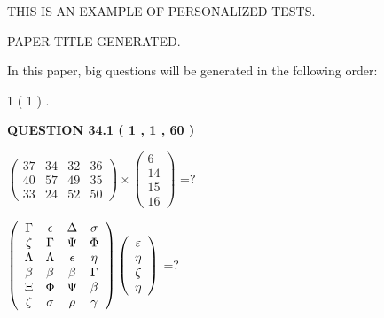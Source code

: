 \documentclass[12pt]{article}
\begin{document}
   
   
   
   
   
 \vspace{0.2in}
{\Huge  THIS IS AN EXAMPLE OF}
{\Huge  PERSONALIZED TESTS. }
   
   
 PAPER TITLE GENERATED.
   
   
   
\vspace{0.2in}
   
In this paper, big questions will be generated in the following order: 
   
   
   1 ( 1 )
 .
  
\vspace{0.2in}
  
{\textbf{\Large{QUESTION
34.1 
 ( 1 , 1 , 60 )
}}}
  
  
 
$ \left( \begin{array}{ccccccccc}
 37  & 
 34  & 
 32  & 
 36  \\ 
 40  & 
 57  & 
 49  & 
 35  \\ 
 33  & 
 24  & 
 52  & 
 50
\end{array}\right) \times
\left( \begin{array}{c}
 6  \\ 
 14  \\ 
 15  \\ 
 16
\end{array}\right) $ =?
 
 
$  %
 \left( \begin{array}
 {
 c
 c
 c
 c
 }
 \Gamma & 
 \epsilon & 
 \Delta & 
 \sigma \\ 
                    \zeta & 
 \Gamma & 
 \Psi & 
 \Phi \\ 
 \Lambda & 
 \Lambda & 
 \epsilon & 
 \eta \\ 
 \beta & 
 \beta & 
 \beta & 
 \Gamma \\ 
                    \Xi & 
 \Phi & 
 \Psi & 
 \beta \\ 
                    \zeta & 
 \sigma & 
 \rho & 
 \gamma
 \end{array} \right)
 \left( \begin{array}
 {
 c
 }
 \varepsilon \\ 
 \eta \\ 
                    \zeta \\ 
 \eta
 \end{array} \right)
$ =?
 
 
 
\noindent{}
 
\end{document}
